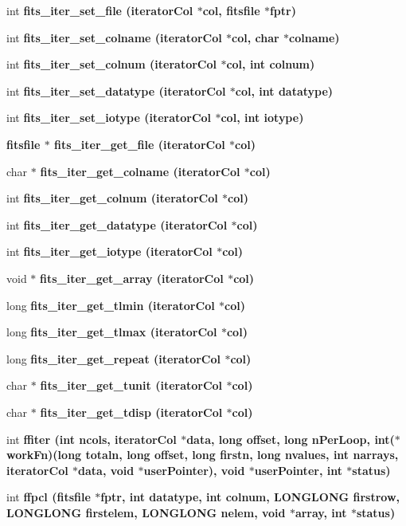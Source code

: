 \begin{CompactItemize}
\item 
int \bf{fits\_\-iter\_\-set\_\-file} (\bf{iterator\-Col} $\ast$col, \bf{fitsfile} $\ast$fptr)
\item 
int \bf{fits\_\-iter\_\-set\_\-colname} (\bf{iterator\-Col} $\ast$col, char $\ast$colname)
\item 
int \bf{fits\_\-iter\_\-set\_\-colnum} (\bf{iterator\-Col} $\ast$col, int colnum)
\item 
int \bf{fits\_\-iter\_\-set\_\-datatype} (\bf{iterator\-Col} $\ast$col, int \bf{datatype})
\item 
int \bf{fits\_\-iter\_\-set\_\-iotype} (\bf{iterator\-Col} $\ast$col, int iotype)
\item 
\bf{fitsfile} $\ast$ \bf{fits\_\-iter\_\-get\_\-file} (\bf{iterator\-Col} $\ast$col)
\item 
char $\ast$ \bf{fits\_\-iter\_\-get\_\-colname} (\bf{iterator\-Col} $\ast$col)
\item 
int \bf{fits\_\-iter\_\-get\_\-colnum} (\bf{iterator\-Col} $\ast$col)
\item 
int \bf{fits\_\-iter\_\-get\_\-datatype} (\bf{iterator\-Col} $\ast$col)
\item 
int \bf{fits\_\-iter\_\-get\_\-iotype} (\bf{iterator\-Col} $\ast$col)
\item 
void $\ast$ \bf{fits\_\-iter\_\-get\_\-array} (\bf{iterator\-Col} $\ast$col)
\item 
long \bf{fits\_\-iter\_\-get\_\-tlmin} (\bf{iterator\-Col} $\ast$col)
\item 
long \bf{fits\_\-iter\_\-get\_\-tlmax} (\bf{iterator\-Col} $\ast$col)
\item 
long \bf{fits\_\-iter\_\-get\_\-repeat} (\bf{iterator\-Col} $\ast$col)
\item 
char $\ast$ \bf{fits\_\-iter\_\-get\_\-tunit} (\bf{iterator\-Col} $\ast$col)
\item 
char $\ast$ \bf{fits\_\-iter\_\-get\_\-tdisp} (\bf{iterator\-Col} $\ast$col)
\item 
int \bf{ffiter} (int ncols, \bf{iterator\-Col} $\ast$data, long offset, long n\-Per\-Loop, int($\ast$work\-Fn)(long totaln, long offset, long firstn, long nvalues, int narrays, \bf{iterator\-Col} $\ast$data, void $\ast$user\-Pointer), void $\ast$user\-Pointer, int $\ast$status)
\item 
int \bf{ffpcl} (\bf{fitsfile} $\ast$fptr, int \bf{datatype}, int colnum, \bf{LONGLONG} firstrow, \bf{LONGLONG} firstelem, \bf{LONGLONG} nelem, void $\ast$array, int $\ast$status)
\item 

\end{CompactItemize}
